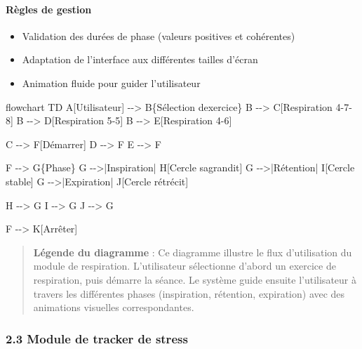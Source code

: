 \documentclass[
]{article}
\newenvironment{Shaded}{}{}
\newcommand{\NormalTok}[1]{#1}
\providecommand{\tightlist}{%
  \setlength{\itemsep}{0pt}\setlength{\parskip}{0pt}}
\begin{document}
\paragraph{Règles de gestion}\label{ruxe8gles-de-gestion-1}

\begin{itemize}
\tightlist
\item
  Validation des durées de phase (valeurs positives et cohérentes)
\item
  Adaptation de l’interface aux différentes tailles d’écran
\item
  Animation fluide pour guider l’utilisateur
\end{itemize}

\begin{Shaded}
\begin{Highlighting}[]
\NormalTok{flowchart TD}
\NormalTok{    A[Utilisateur] {-}{-}\textgreater{} B\{Sélection d\textquotesingle{}exercice\}}
\NormalTok{    B {-}{-}\textgreater{} C[Respiration 4{-}7{-}8]}
\NormalTok{    B {-}{-}\textgreater{} D[Respiration 5{-}5]}
\NormalTok{    B {-}{-}\textgreater{} E[Respiration 4{-}6]}
    
\NormalTok{    C {-}{-}\textgreater{} F[Démarrer]}
\NormalTok{    D {-}{-}\textgreater{} F}
\NormalTok{    E {-}{-}\textgreater{} F}
    
\NormalTok{    F {-}{-}\textgreater{} G\{Phase\}}
\NormalTok{    G {-}{-}\textgreater{}|Inspiration| H[Cercle s\textquotesingle{}agrandit]}
\NormalTok{    G {-}{-}\textgreater{}|Rétention| I[Cercle stable]}
\NormalTok{    G {-}{-}\textgreater{}|Expiration| J[Cercle rétrécit]}
    
\NormalTok{    H {-}{-}\textgreater{} G}
\NormalTok{    I {-}{-}\textgreater{} G}
\NormalTok{    J {-}{-}\textgreater{} G}
    
\NormalTok{    F {-}{-}\textgreater{} K[Arrêter]}
\end{Highlighting}
\end{Shaded}

\begin{quote}
\textbf{Légende du diagramme} : Ce diagramme illustre le flux
d’utilisation du module de respiration. L’utilisateur sélectionne
d’abord un exercice de respiration, puis démarre la séance. Le système
guide ensuite l’utilisateur à travers les différentes phases
(inspiration, rétention, expiration) avec des animations visuelles
correspondantes.
\end{quote}

\subsubsection{2.3 Module de tracker de
stress}\label{module-de-tracker-de-stress}
\end{document}
